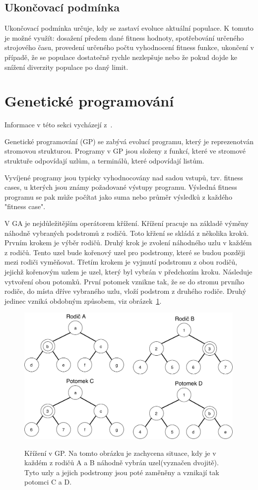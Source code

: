 \subsection{Ukončovací podmínka}
Ukončovací podmínka určuje, kdy se zastaví evoluce aktuální populace.
K tomuto je možné využít: dosažení předem dané fitness hodnoty, spotřebování určeného strojového času, provedení určeného počtu vyhodnocení fitness funkce, ukončení v případě, že se populace dostatečně rychle nezlepšuje nebo že pokud dojde ke snížení diverzity populace po daný limit.

\section{Genetické programování}
\label{sec:gp}

Informace v této sekci vycházejí z~\cite{Koza1992}.

Genetické programování (GP) se zabývá evolucí programu, který je reprezenotván stromovou strukturou.
Programy v GP jsou složeny z funkcí, které ve stromové struktuře odpovídají uzlům, a terminálů, které odpovídají listům.

Vyvíjené programy jsou typicky vyhodnocovány nad sadou vstupů, tzv. fitness cases, u kterých jsou známy požadované výstupy programu.
Výsledná fitness programu se pak může počítat jako suma nebo průměr výsledků z každého "fitness case".

V GA je nejdůležitějším operátorem křížení.
Křížení pracuje na základě výměny náhodně vybraných podstromů z rodičů.
Toto křžení se skládá z několika kroků.
Prvním krokem je výběr rodičů.
Druhý krok je zvolení náhodného uzlu v každém z rodičů.
Tento uzel bude kořenový uzel pro podstromy, které se budou později mezi rodiči vyměňovat.
Třetím krokem je vyjmutí podstromu z obou rodičů, jejichž kořenovým uzlem je uzel, který byl vybrán v předchozím kroku.
Následuje vytvoření obou potomků.
První potomek vznikne tak, že se do stromu prvního rodiče, do místa dříve vybraného uzlu, vloží podstrom z druhého rodiče.
Druhý jedinec vzniká obdobným způsobem, viz obrázek~\ref{fig:GP_krizeni}.

\begin{figure}[h]
    \centering
    {\includegraphics[width=30em]{obrazky/gp_krizeni.pdf}}
    \caption{
    Křížení v GP.
    Na tomto obrázku je zachycena situace, kdy je v každém z rodičů A a B náhodně vybrán uzel(vyznačen dvojitě).
    Tyto uzly a jejich podstromy jsou poté zaměněny a vznikají tak potomci C a D.
    }
    \label{fig:GP_krizeni}
\end{figure}

